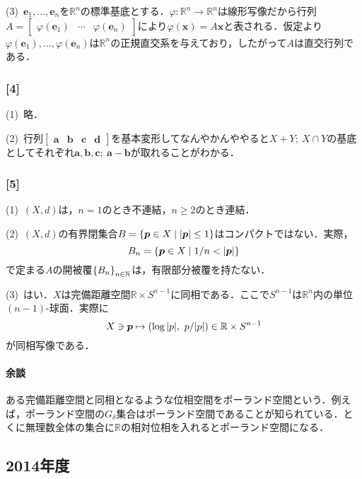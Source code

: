 \documentclass[a4j]{ltjsarticle}
\newcommand{\Rset}{\mathbb{R}}
\newcommand{\Nset}{\mathbb{N}}
\newcommand{\1}{\mathbbm{1}}
\numberwithin{equation}{section}
\theoremstyle{definition}
\begin{document}
(3)\ $\bm{e}_1,\ldots,\bm{e}_n$を$\Rset^n$の標準基底とする．$\varphi\colon \Rset^n\to \Rset^n$は線形写像だから行列$A=\begin{bmatrix}
    \varphi(\bm{e}_1) & \cdots & \varphi(\bm{e}_n)
\end{bmatrix}$により$\varphi(\bm{x})=A\bm{x}$と表される．仮定より$\varphi(\bm{e}_1),\ldots,\varphi(\bm{e}_n)$は$\Rset^n$の正規直交系を与えており，したがって$A$は直交行列である．

\subsubsection*{[4]}
(1)\ 略．

(2)\ 行列$\begin{bmatrix}
    \mathbf{a} & \mathbf{b} & \mathbf{c} & \mathbf{d}
\end{bmatrix}$を基本変形してなんやかんややると$X+Y;\ X\cap Y$の基底としてそれぞれ$\mathbf{a},\mathbf{b},\mathbf{c};\ \mathbf{a}-\mathbf{b}$が取れることがわかる．

\subsubsection*{[5]}
(1)\ $(X,d)$は，$n=1$のとき不連結，$n\geq2$のとき連結．

(2)\ $(X,d)$の有界閉集合$B=\qty{\bm{p}\in X\mid \abs{\bm p}\leq 1}$はコンパクトではない．実際，
\begin{equation}
    B_n=\qty{\bm{p}\in X\mid  1/n< \abs{\bm{p}}}
\end{equation}
で定まる$A$の開被覆$\qty{B_n}_{n\in\Nset}$は，有限部分被覆を持たない．

(3)\ はい．$X$は完備距離空間$\Rset \times S^{n-1}$に同相である．ここで$S^{n-1}$は$\Rset^n$内の単位$(n-1)$-球面．実際に
\begin{equation}
    X\ni \bm{p}\mapsto(\log \abs{p},\ p/\abs{p})\in \Rset\times S^{n-1}
\end{equation}
が同相写像である．
\paragraph*{余談}ある完備距離空間と同相となるような位相空間をポーランド空間という．例えば，ポーランド空間の$G_\delta$集合はポーランド空間であることが知られている．とくに無理数全体の集合に$\Rset$の相対位相を入れるとポーランド空間になる．
\subsection{2014年度}
\end{document}
